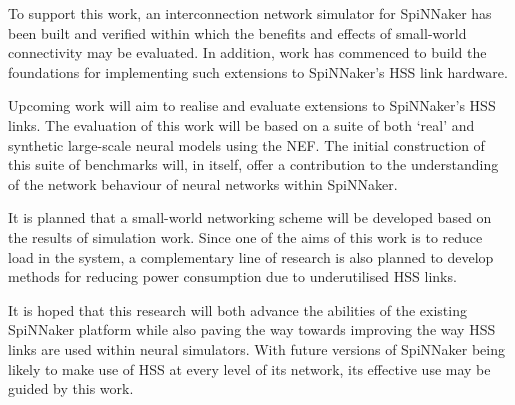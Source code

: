 	To support this work, an interconnection network simulator for SpiNNaker has
	been built and verified within which the benefits and effects of small-world
	connectivity may be evaluated. In addition, work has commenced to build the
	foundations for implementing such extensions to SpiNNaker's HSS link hardware.
	
	Upcoming work will aim to realise and evaluate extensions to SpiNNaker's HSS
	links. The evaluation of this work will be based on a suite of both `real' and
	synthetic large-scale neural models using the NEF.  The initial construction
	of this suite of benchmarks will, in itself, offer a contribution to the
	understanding of the network behaviour of neural networks within SpiNNaker.
	
	It is planned that a small-world networking scheme will be developed based on
	the results of simulation work. Since one of the aims of this work is to
	reduce load in the system, a complementary line of research is also planned to
	develop methods for reducing power consumption due to underutilised HSS links.
	
	It is hoped that this research will both advance the abilities of the existing
	SpiNNaker platform while also paving the way towards improving the way HSS
	links are used within neural simulators. With future versions of SpiNNaker
	being likely to make use of HSS at every level of its network, its effective
	use may be guided by this work.

